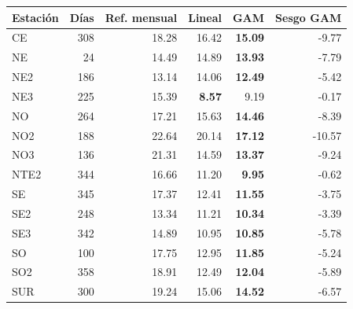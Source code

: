 \begin{tabular}{@{}lrrrrr@{}}
\toprule
Estación & Días & Ref. mensual & Lineal & GAM & Sesgo GAM \\
\midrule
CE & 308 & 18.28 & 16.42 & \textbf{15.09} & -9.77 \\
NE & 24 & 14.49 & 14.89 & \textbf{13.93} & -7.79 \\
NE2 & 186 & 13.14 & 14.06 & \textbf{12.49} & -5.42 \\
NE3 & 225 & 15.39 & \textbf{8.57} & 9.19 & -0.17 \\
NO & 264 & 17.21 & 15.63 & \textbf{14.46} & -8.39 \\
NO2 & 188 & 22.64 & 20.14 & \textbf{17.12} & -10.57 \\
NO3 & 136 & 21.31 & 14.59 & \textbf{13.37} & -9.24 \\
NTE2 & 344 & 16.66 & 11.20 & \textbf{9.95} & -0.62 \\
SE & 345 & 17.37 & 12.41 & \textbf{11.55} & -3.75 \\
SE2 & 248 & 13.34 & 11.21 & \textbf{10.34} & -3.39 \\
SE3 & 342 & 14.89 & 10.95 & \textbf{10.85} & -5.78 \\
SO & 100 & 17.75 & 12.95 & \textbf{11.85} & -5.24 \\
SO2 & 358 & 18.91 & 12.49 & \textbf{12.04} & -5.89 \\
SUR & 300 & 19.24 & 15.06 & \textbf{14.52} & -6.57 \\
\bottomrule
\end{tabular}